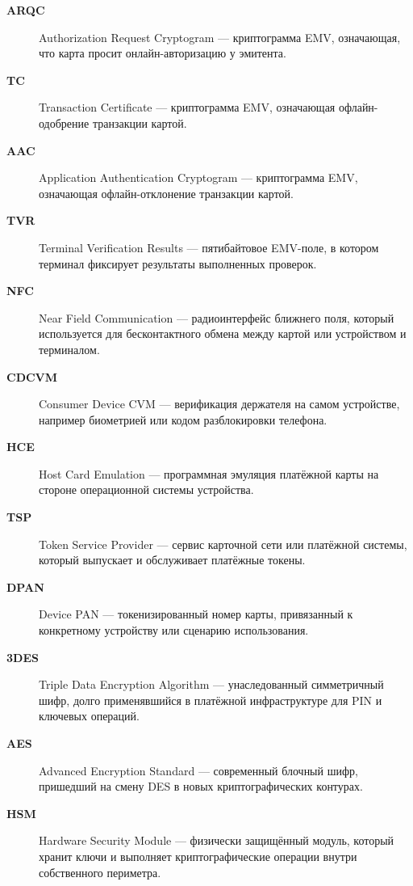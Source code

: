 \begin{description}
  \item[\textbf{ARQC}] Authorization Request Cryptogram — криптограмма EMV, означающая, что карта просит онлайн-авторизацию у эмитента.

  \item[\textbf{TC}] Transaction Certificate — криптограмма EMV, означающая офлайн-одобрение транзакции картой.

  \item[\textbf{AAC}] Application Authentication Cryptogram — криптограмма EMV, означающая офлайн-отклонение транзакции картой.

  \item[\textbf{TVR}] Terminal Verification Results — пятибайтовое EMV-поле, в котором терминал фиксирует результаты выполненных проверок.

  \item[\textbf{NFC}] Near Field Communication — радиоинтерфейс ближнего поля, который используется для бесконтактного обмена между картой или устройством и терминалом.

  \item[\textbf{CDCVM}] Consumer Device CVM — верификация держателя на самом устройстве, например биометрией или кодом разблокировки телефона.

  \item[\textbf{HCE}] Host Card Emulation — программная эмуляция платёжной карты на стороне операционной системы устройства.

  \item[\textbf{TSP}] Token Service Provider — сервис карточной сети или платёжной системы, который выпускает и обслуживает платёжные токены.

  \item[\textbf{DPAN}] Device PAN — токенизированный номер карты, привязанный к конкретному устройству или сценарию использования.

  \item[\textbf{3DES}] Triple Data Encryption Algorithm — унаследованный симметричный шифр, долго применявшийся в платёжной инфраструктуре для PIN и ключевых операций.

  \item[\textbf{AES}] Advanced Encryption Standard — современный блочный шифр, пришедший на смену DES в новых криптографических контурах.

  \item[\textbf{HSM}] Hardware Security Module — физически защищённый модуль, который хранит ключи и выполняет криптографические операции внутри собственного периметра.


\end{description}
